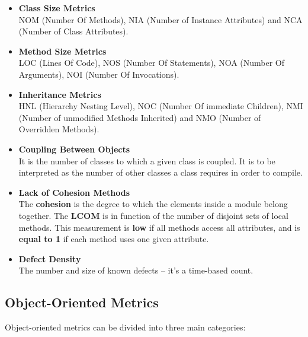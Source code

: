 \documentclass{article}
\begin{document}
\begin{itemize}
	\item \textbf{Class Size Metrics}
	\vspace{.2cm} \\
	NOM (Number Of Methods), NIA (Number of Instance Attributes) and NCA (Number of Class Attributes).
	
	\item \textbf{Method Size Metrics}
	\vspace{.2cm} \\
	LOC (Lines Of Code), NOS (Number Of Statements), NOA (Number Of Arguments), NOI (Number Of Invocations).
	
	\item \textbf{Inheritance Metrics}
	\vspace{.2cm} \\
	HNL (Hierarchy Nesting Level), NOC (Number Of immediate Children), NMI (Number of unmodified Methods Inherited) and NMO (Number of Overridden Methods).
	
	\item \textbf{Coupling Between Objects}
	\vspace{.2cm} \\
	It is the number of classes to which a given class is coupled. It is to be interpreted as the number of other classes a class requires in order to compile.
	
	\item \textbf{Lack of Cohesion Methods}
	\vspace{.2cm} \\
	The \textbf{cohesion} is the degree to which the elements inside a module belong together. The \textbf{LCOM} is in function of the number of disjoint sets of local methods. This measurement is \textbf{low} if all methods access all attributes, and is \textbf{equal to 1} if each method uses one given attribute.
	
	\item \textbf{Defect Density}
	\vspace{.2cm} \\
	The number and size of known defects -- it's a time-based count.
\end{itemize}

\subsection{Object-Oriented Metrics}
Object-oriented metrics can be divided into three main categories:
\end{document}
